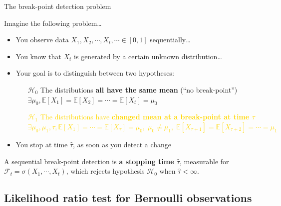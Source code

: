 \documentclass[11pt,english,ignorenonframetext,]{beamer}
\begin{document}
\begin{frame}{The break-point detection problem}

  Imagine the following problem\ldots

  \begin{itemize}
    \item You observe data $X_1,X_2,\cdots,X_t,\cdots \in[0,1]$ sequentially\ldots
    \item You know that $X_t$ is generated by a certain \alert{unknown} distribution\ldots

    \pause
    \item \alert{Your goal} is to distinguish between two hypotheses:
    \begin{itemize}
      \item[\textcolor{deeppurple}{$\mathcal{H}_0$}] \textcolor{deeppurple}{The distributions \textbf{all have the same mean} \hfill{} (``no break-point'')\\
      $\exists \mu_0, \mathbb{E}[X_1] = \mathbb{E}[X_2] = \cdots = \mathbb{E}[X_t] = \mu_0$}

      \item[\textcolor{gold}{$\mathcal{H}_1$}] \textcolor{gold}{The distributions have \textbf{changed mean at a break-point at time $\tau$} \\
      $\exists \mu_0, \mu_1, \tau, \mathbb{E}[X_1] = \cdots = \mathbb{E}[X_{\tau}] = \mu_0, \; \mu_0 \neq \mu_1, \; \mathbb{E}[X_{\tau+1}] = \mathbb{E}[X_{\tau+2}] = \cdots = \mu_1$}
    \end{itemize}
    \item You stop at time $\widehat{\tau}$, as soon as you detect a change
  \end{itemize}

  \pause
  A \alert{sequential break-point detection} is \alert{\textbf{a stopping time $\widehat{\tau}$}},
  measurable for $\mathcal{F}_t = \sigma(X_1,\cdots,X_t)$,
  which rejects hypothesis \textcolor{deeppurple}{$\mathcal{H}_0$}
  when $\widehat{\tau} < \infty$.

\end{frame}


\subsection{\hfill{}Likelihood ratio test for Bernoulli observations\hfill{}}
\end{document}
